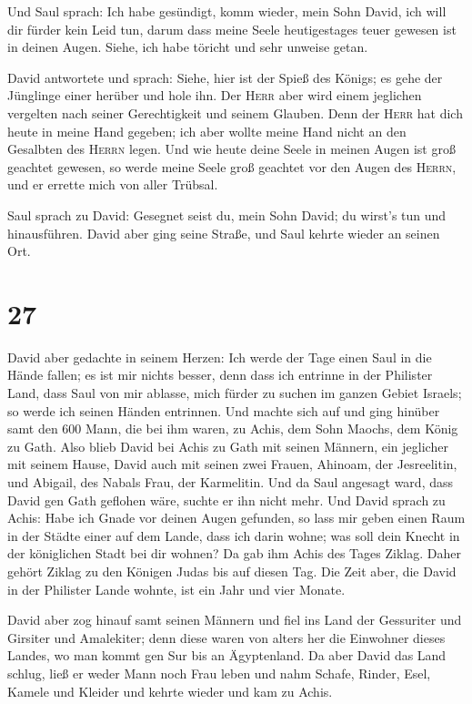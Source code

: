  Und Saul sprach: Ich habe gesündigt, komm wieder, mein
Sohn David, ich will dir fürder kein Leid tun, darum dass meine Seele
heutigestages teuer gewesen ist in deinen Augen. Siehe, ich habe töricht
und sehr unweise getan.

 David antwortete und sprach: Siehe, hier ist der Spieß
des Königs; es gehe der Jünglinge einer herüber und hole ihn.
 Der \textsc{Herr} aber wird einem jeglichen vergelten
nach seiner Gerechtigkeit und seinem Glauben. Denn der \textsc{Herr} hat
dich heute in meine Hand gegeben; ich aber wollte meine Hand nicht an
den Gesalbten des \textsc{Herrn} legen.  Und wie heute
deine Seele in meinen Augen ist groß geachtet gewesen, so werde meine
Seele groß geachtet vor den Augen des \textsc{Herrn}, und er errette
mich von aller Trübsal.

 Saul sprach zu David: Gesegnet seist du, mein Sohn
David; du wirst's tun und hinausführen. David aber ging seine Straße,
und Saul kehrte wieder an seinen Ort.

\hypertarget{section-26}{%
\section{27}\label{section-26}}

 David aber gedachte in seinem Herzen: Ich werde der Tage
einen Saul in die Hände fallen; es ist mir nichts besser, denn dass ich
entrinne in der Philister Land, dass Saul von mir ablasse, mich fürder
zu suchen im ganzen Gebiet Israels; so werde ich seinen Händen
entrinnen.  Und machte sich auf und ging hinüber samt den
600 Mann, die bei ihm waren, zu Achis, dem Sohn Maochs, dem König zu
Gath.  Also blieb David bei Achis zu Gath mit seinen
Männern, ein jeglicher mit seinem Hause, David auch mit seinen zwei
Frauen, Ahinoam, der Jesreelitin, und Abigail, des Nabals Frau, der
Karmelitin.  Und da Saul angesagt ward, dass David gen
Gath geflohen wäre, suchte er ihn nicht mehr.  Und David
sprach zu Achis: Habe ich Gnade vor deinen Augen gefunden, so lass mir
geben einen Raum in der Städte einer auf dem Lande, dass ich darin
wohne; was soll dein Knecht in der königlichen Stadt bei dir wohnen?
 Da gab ihm Achis des Tages Ziklag. Daher gehört Ziklag zu
den Königen Judas bis auf diesen Tag.  Die Zeit aber, die
David in der Philister Lande wohnte, ist ein Jahr und vier Monate.

 David aber zog hinauf samt seinen Männern und fiel ins
Land der Gessuriter und Girsiter und Amalekiter; denn diese waren von
alters her die Einwohner dieses Landes, wo man kommt gen Sur bis an
Ägyptenland.  Da aber David das Land schlug, ließ er weder
Mann noch Frau leben und nahm Schafe, Rinder, Esel, Kamele und Kleider
und kehrte wieder und kam zu Achis.

